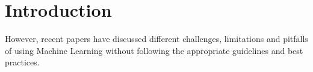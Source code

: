 
\section{Introduction}



However, recent papers have discussed different challenges, limitations and pitfalls of using Machine Learning without following the appropriate guidelines and best practices. 





